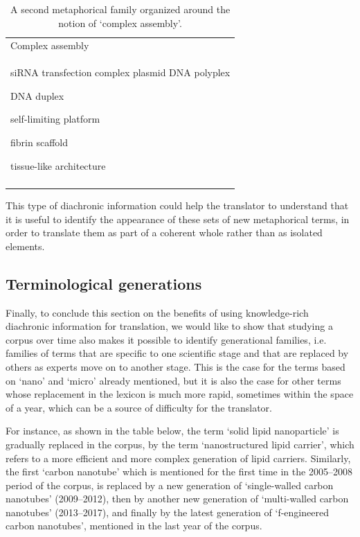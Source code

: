\documentclass[output=paper]{langscibook}
\begin{document}
\begin{table}
\begin{tabularx}{.8\textwidth}{X}
\lsptoprule
{{{Complex assembly}}}\\
siRNA transfection complex plasmid DNA polyplex

DNA duplex

self-limiting platform

fibrin scaffold

tissue-like architecture\\
\lspbottomrule
\end{tabularx}
\caption{A second metaphorical family organized around the notion of ‘complex assembly’.}
\label{tab:key:7}
\end{table}

This type of diachronic information could help the translator to understand that it is useful to identify the appearance of these sets of new metaphorical terms, in order to translate them as part of a coherent whole rather than as isolated elements.

\subsection{Terminological generations}\label{sec:cuchet:3.5}

Finally, to conclude this section on the benefits of using knowledge-rich diachronic information for translation, we would like to show that studying a corpus over time also makes it possible to identify generational families, i.e. families of terms that are specific to one scientific stage and that are replaced by others as experts move on to another stage. This is the case for the terms based on ‘nano’ and ‘micro’ already mentioned, but it is also the case for other terms whose replacement in the lexicon is much more rapid, sometimes within the space of a year, which can be a source of difficulty for the translator.

For instance, as shown in the table below, the term ‘solid lipid nanoparticle’ is gradually replaced in the corpus, by the term ‘nanostructured lipid carrier’, which refers to a more efficient and more complex generation of lipid carriers. Similarly, the first ‘carbon nanotube’ which is mentioned for the first time in the 2005–2008 period of the corpus, is replaced by a new generation of ‘single-walled carbon nanotubes’ (2009–2012), then by another new generation of ‘multi-walled carbon nanotubes’ (2013–2017), and finally by the latest generation of ‘f-engineered carbon nanotubes’, mentioned in the last year of the corpus.
\end{document}
